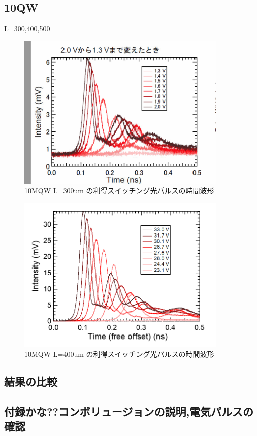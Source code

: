 \subsection{10QW}%
L=300,400,500
\begin{figure}[h]
	\centering
	\includegraphics[width=10cm]{figure/fig_3_1_10QW_ridge_L300_GS.png}
		\caption{10MQW L=300um の利得スイッチング光パルスの時間波形}
		\label{fig:fig_3_1_10QW_ridge_L400_GS}
\end{figure}

\begin{figure}[h]
	\centering
	\includegraphics[width=10cm]{figure/fig_3_1_10QW_ridge_L400_GS.png}
		\caption{10MQW L=400um の利得スイッチング光パルスの時間波形}
		\label{fig:fig_3_1_10QW_ridge_L400_GS}
\end{figure}

\subsection{結果の比較}%
\subsection{付録かな??コンボリュージョンの説明,電気パルスの確認}%

